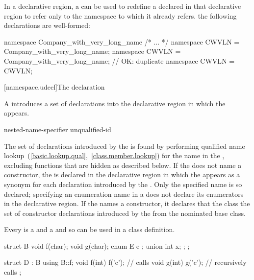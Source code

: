 \pnum
In a declarative region, a  can be
used to redefine a  declared in that
declarative region to refer only to the namespace to which it already
refers.
\enterexample
the following declarations are well-formed:

\begin{codeblock}
namespace Company_with_very_long_name { /* ... */ }
namespace CWVLN = Company_with_very_long_name;
namespace CWVLN = Company_with_very_long_name;          // OK: duplicate
namespace CWVLN = CWVLN;
\end{codeblock}
\exitexample

[namespace.udecl]{The  declaration}%

\pnum
A  introduces a set of declarations into the declarative
region in which the  appears.

\begin{bnf}
\br
     nested-name-specifier unqualified-id \terminal{;}\br
\end{bnf}

The set of declarations introduced by the  is found by
performing qualified name lookup~(\ref{basic.lookup.qual},~\ref{class.member.lookup})
for the name in the ,
excluding functions that are hidden as described below.
If the  does not name a constructor,
the  is declared in the declarative region
in which the  appears
as a synonym for each declaration introduced by the .
\enternote Only the specified name is so declared;
specifying an enumeration name in a 
does not declare its enumerators
in the  declarative region.
\exitnote
{}%
If the  names a constructor,
it declares that the class  the set of constructor declarations
introduced by the  from the nominated base class.

\pnum
Every  is a  and a
 and so can be used in a class definition.
\enterexample

\begin{codeblock}
struct B {
  void f(char);
  void g(char);
  enum E { e };
  union { int x; };
};

struct D : B {
  using B::f;
  void f(int) { f('c'); }       // calls 
  void g(int) { g('c'); }       // recursively calls 
};
\end{codeblock}
\exitexample

